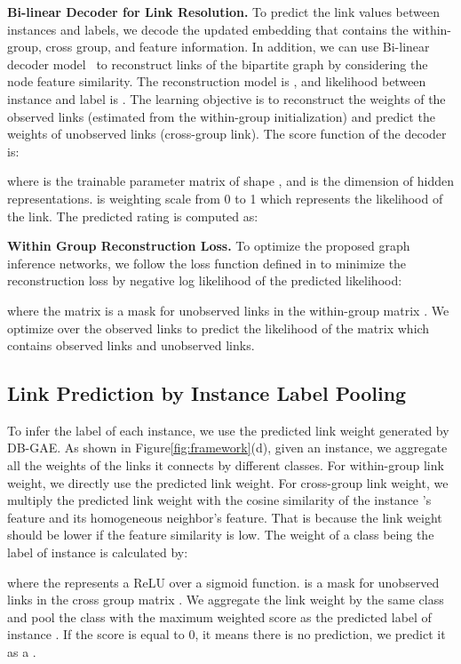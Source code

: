 \documentclass[letterpaper]{article} \usepackage{aaai20}  \usepackage{times}  \usepackage{helvet} \usepackage{courier}  \usepackage[hyphens]{url}  \usepackage{graphicx} \urlstyle{rm} \def\UrlFont{\rm}  \frenchspacing  \setlength{\pdfpagewidth}{8.5in}  \setlength{\pdfpageheight}{11in}  \frenchspacing
\begin{document}
\noindent\textbf{Bi-linear Decoder for Link Resolution.}
To predict the link values between instances and labels, we decode the updated embedding that contains the within-group, cross group, and feature information.
In addition, we can use Bi-linear decoder model~\cite{kiros2014unifying} to reconstruct links of the bipartite graph by considering the node feature similarity.
The reconstruction model is , and likelihood between instance  and label  is . The learning objective is to reconstruct the weights of the observed links (estimated from the within-group initialization) and predict the weights of unobserved links (cross-group link).  The score function of the decoder is:

where  is the trainable parameter matrix of shape , and  is the dimension of hidden representations.  is weighting scale from 0 to 1 which represents the likelihood of the link.
The predicted rating is computed as:
{\footnotesize{
}
}


\noindent \textbf{Within Group Reconstruction Loss.} To optimize the proposed graph inference networks, we follow the loss function defined in \cite{berg2017graph} to minimize the reconstruction loss by negative log likelihood of the predicted likelihood:
 
where the matrix  is a mask for unobserved links in the within-group matrix . We optimize over the observed links to predict the likelihood of the matrix  which contains observed links and unobserved links. 




\subsection{Link Prediction by Instance Label Pooling}
To infer the label of each instance, we use the predicted link weight  generated by DB-GAE. 
As shown in Figure\ref{fig:framework}(d), given an instance, we aggregate all the weights of the links it connects by different classes. For within-group link weight, we directly use the predicted link weight. For cross-group link weight, we multiply the predicted link weight with the cosine similarity of the instance 's feature and its homogeneous neighbor's feature. That is because the link weight should be lower if the feature similarity is low. The weight of a class  being the label of instance  is calculated by:
 
 where the  represents a ReLU over a sigmoid function.  is a mask for unobserved links in the cross group matrix .
 We aggregate the link weight by the same class and pool the class with the maximum weighted score  as the predicted label of instance . 
 If the score is equal to 0, it means there is no prediction, we predict it as a . 
\end{document}
